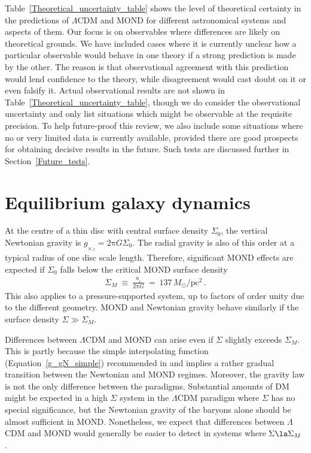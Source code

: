 \documentclass[fleqn,usenatbib,useAMS]{mnras} %
\begin{document}
Table~\ref{Theoretical_uncertainty_table} shows the level of theoretical certainty in the predictions of $\Lambda$CDM and MOND for different astronomical systems and aspects of them. Our focus is on observables where differences are likely on theoretical grounds. We have included cases where it is currently unclear how a particular observable would behave in one theory if a strong prediction is made by the other. The reason is that observational agreement with this prediction would lend confidence to the theory, while disagreement would cast doubt on it or even falsify it. Actual observational results are not shown in Table~\ref{Theoretical_uncertainty_table}, though we do consider the observational uncertainty and only list situations which might be observable at the requisite precision. To help future-proof this review, we also include some situations where no or very limited data is currently available, provided there are good prospects for obtaining decisive results in the future. Such tests are discussed further in Section~\ref{Future_tests}.





\section{Equilibrium galaxy dynamics}
\label{Equilibrium_galaxy_dynamics}

At the centre of a thin disc with central surface density $\Sigma_0$, the vertical Newtonian gravity is $g_{_{N,z}} = 2 \mathrm{\pi}G\Sigma_0$. The radial gravity is also of this order at a typical radius of one disc scale length. Therefore, significant MOND effects are expected if $\Sigma_0$ falls below the critical MOND surface density
\begin{eqnarray}
	\Sigma_M ~\equiv~ \frac{a_{_0}}{2 \mathrm{\pi} G} ~=~ 137 \, M_\odot/\text{pc}^2 \, .
	\label{Sigma_M}
\end{eqnarray}
This also applies to a pressure-supported system, up to factors of order unity due to the different geometry. MOND and Newtonian gravity behave similarly if the surface density $\Sigma \gg \Sigma_M$.

Differences between $\Lambda$CDM and MOND can arise even if $\Sigma$ slightly exceeds $\Sigma_M$. This is partly because the simple interpolating function (Equation~\ref{g_gN_simple}) recommended in \citet{Iocco_Bertone_2015} and \citet{Banik_2018_Centauri} implies a rather gradual transition between the Newtonian and MOND regimes. Moreover, the gravity law is not the only difference between the paradigms. Substantial amounts of DM might be expected in a high $\Sigma$ system in the $\Lambda$CDM paradigm where $\Sigma$ has no special significance, but the Newtonian gravity of the baryons alone should be almost sufficient in MOND. Nonetheless, we expect that differences between $\Lambda$CDM and MOND would generally be easier to detect in systems where $\Sigma \la \Sigma_M$ \citep{Milgrom_1983}.
\end{document}
